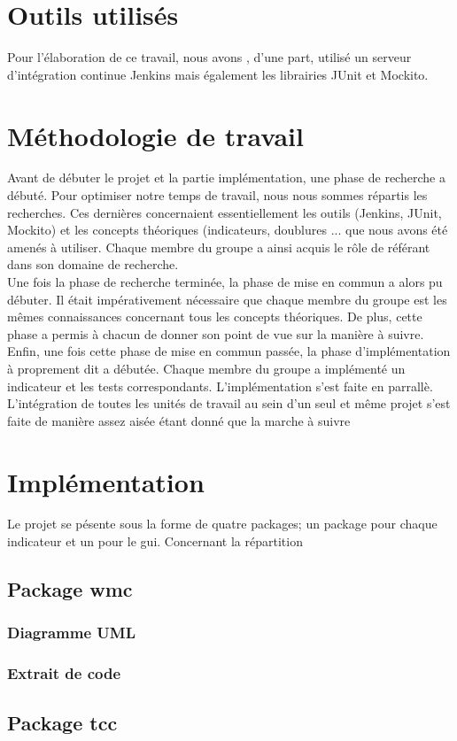 \documentclass[11pt]{report}
\begin{document}
\chapter{Outils utilisés}
	Pour l'élaboration de ce travail, nous avons , d'une part, utilisé un serveur d'intégration continue Jenkins mais également les librairies JUnit et Mockito. 

\chapter{Méthodologie de travail}
Avant de débuter le projet et la partie implémentation, une phase de recherche a débuté. Pour optimiser notre temps de travail, nous nous sommes répartis les recherches. Ces dernières concernaient essentiellement les outils (Jenkins, JUnit, Mockito)  et les concepts théoriques (indicateurs, doublures ... que nous avons été amenés à utiliser. Chaque membre du groupe a ainsi acquis le rôle de référant dans son domaine de recherche.\\ 

Une fois la phase de recherche terminée, la phase de mise en commun a alors pu débuter. Il était impérativement nécessaire que chaque membre du groupe est les mêmes connaissances concernant tous les concepts théoriques. De plus, cette phase a permis à chacun de donner son point de vue sur la manière à suivre.\\ 

Enfin, une fois cette phase de mise en commun passée, la phase d'implémentation à proprement dit a débutée. Chaque membre du groupe a implémenté un indicateur et les tests correspondants. L'implémentation s'est faite en parrallè. L'intégration de toutes les unités de travail au sein d'un seul et même projet s'est faite de manière assez aisée étant donné que la marche à suivre  \\ 


\chapter{Implémentation}

	Le projet se pésente sous la forme de quatre packages; un package pour chaque indicateur et un pour le gui. Concernant la répartition 
	
	\section{Package wmc}
		\subsection{Diagramme UML}
		\subsection{Extrait de code}
		
	\section{Package tcc}
\end{document}
